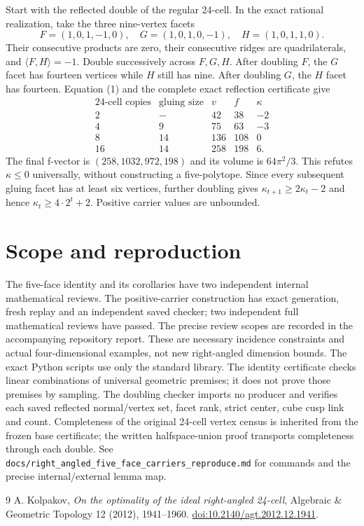 \documentclass[11pt]{article}
\begin{document}
Start with the reflected double of the regular 24-cell. In the exact
rational realization, take the three nine-vertex facets
\[
 F=(1,0,1,-1,0),\quad G=(1,0,1,0,-1),\quad H=(1,0,1,1,0).
\]
Their consecutive products are zero, their consecutive ridges are
quadrilaterals, and $\langle F,H\rangle=-1$. Double successively across
$F,G,H$. After doubling $F$, the $G$ facet has fourteen vertices while
$H$ still has nine. After doubling $G$, the $H$ facet has fourteen.
Equation (1) and the complete exact reflection certificate give
\[
\begin{array}{c|r|r|r|r}
\text{24-cell copies}&\text{gluing size}&v&f&\kappa\\\hline
2&-&42&38&-2\\
4&9&75&63&-3\\
8&14&136&108&0\\
16&14&258&198&6.
\end{array}
\]
The final f-vector is $(258,1032,972,198)$ and its volume is
$64\pi^2/3$. This refutes $\kappa\le0$ universally, without constructing a
five-polytope. Since every subsequent gluing facet has at least six
vertices, further doubling gives
$\kappa_{t+1}\ge2\kappa_t-2$ and hence $\kappa_t\ge4\cdot2^t+2$.
Positive carrier values are unbounded.

\section{Scope and reproduction}
The five-face identity and its corollaries have two independent internal
mathematical reviews. The positive-carrier construction has exact generation,
fresh replay and an independent saved checker; two independent full mathematical reviews have passed. The precise review
scopes are recorded in the accompanying repository report. These are necessary
incidence constraints and actual four-dimensional examples, not new
right-angled dimension bounds.
The exact Python scripts use only the standard library. The identity
certificate checks linear combinations of universal geometric premises;
it does not prove those premises by sampling. The doubling checker imports
no producer and verifies each saved reflected normal/vertex set, facet
rank, strict center, cube cusp link and count. Completeness of the original
24-cell vertex census is inherited from the frozen base certificate; the
written halfspace-union proof transports completeness through each double.
See \texttt{docs/right\_angled\_five\_face\_carriers\_reproduce.md} for commands
and the precise internal/external lemma map.

\begin{thebibliography}{9}
 A. Kolpakov, \emph{On the optimality of the ideal right-angled
24-cell}, Algebraic \& Geometric Topology 12 (2012), 1941--1960.
\href{https://doi.org/10.2140/agt.2012.12.1941}{doi:10.2140/agt.2012.12.1941}.
\end{thebibliography}
\end{document}
